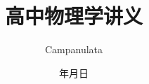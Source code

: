 \documentclass[cn,10.5pt,chinese,mac,chinesefont=founder]{elegantbook}
\title{高中物理学讲义}
\author{Campanulata}
\date{{\the\year}年{\the\month}月{\the\day}日}
\begin{document}
\maketitle
\frontmatter



\tableofcontents

\mainmatter

\end{document}
